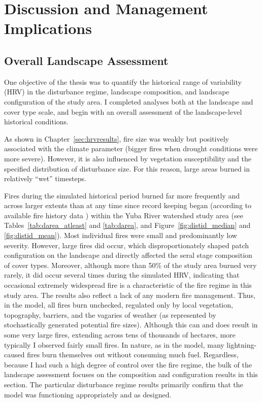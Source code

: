 
\section{Discussion and Management Implications}
\label{sec:hrvdiscussion}






\subsection{Overall Landscape Assessment}

One objective of the thesis was to quantify the historical range of variability (HRV) in the disturbance regime, landscape composition, and landscape configuration of the study area. I completed analyses both at the landscape and cover type scale, and begin with an overall assessment of the landscape-level historical conditions.

As shown in Chapter~\ref{sec:hrvresults}, fire size was weakly but positively associated with the climate parameter (bigger fires when drought conditions were more severe). However, it is also influenced by vegetation susceptibility and the specified distribution of disturbance size. For this reason, large areas burned in relatively ``wet'' timesteps. 

Fires during the simulated historical period burned far more frequently and across larger extents than at any time since record keeping began (according to available fire history data \citep{calfire2012,usgs-fire-data2012}) within the Yuba River watershed study area (see Tables~\ref{tab:darea_atleast} and \ref{tab:darea}, and Figure~\ref{fig:distid_median} and \ref{fig:distid_mean}). Most individual fires were small and predominantly low severity. However, large fires did occur, which disproportionately shaped patch configuration on the landscape and directly affected the seral stage composition of cover types. Moreover, although more than 50\% of the study area burned very rarely, it did occur several times during the simulated HRV, indicating that occasional extremely widespread fire is a characteristic of the fire regime in this study area. The results also reflect a lack of any modern fire management. Thus, in the model, all fires burn unchecked, regulated only by local vegetation, topography, barriers, and the vagaries of weather (as represented by stochastically generated potential fire sizes). Although this can and does result in some very large fires, extending across tens of thousands of hectares, more typically I observed fairly small fires. In nature, as in the model, many lightning-caused fires burn themselves out without consuming much fuel. Regardless, because I had such a high degree of control over the fire regime, the bulk of the landscape assessment focuses on the composition and configuration results in this section. The particular disturbance regime results primarily confirm that the model was functioning appropriately and as designed.

